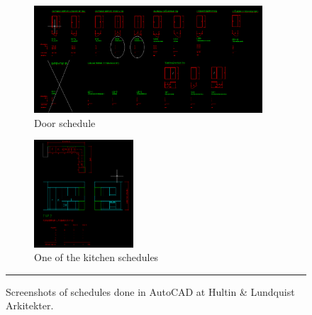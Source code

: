 \begin{figure}[htbp]
	\centering
	\begin{subfigure}{.48\textwidth}
		\centering
		\includegraphics[height=4cm]{figures/door-schedule.png}
		\caption{Door schedule}
		\label{fig:sched_doors}
	\end{subfigure}
	\begin{subfigure}{.48\textwidth}
		\centering
		\includegraphics[height=4cm]{figures/kitchen-schedule.png}
		\caption{One of the kitchen schedules}
		\label{fig:sched_kitchen}
	\end{subfigure}
	\rule{\textwidth}{0.5pt} %
	\caption[Hultin \& Lundquist Arkitekter schedules.]{Screenshots of schedules done in AutoCAD at Hultin \& Lundquist Arkitekter.}
	\label{fig:schedules}
\end{figure}